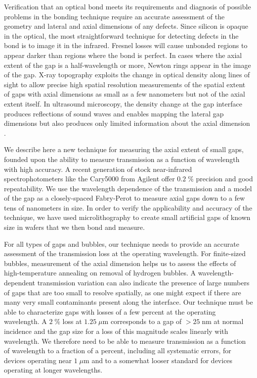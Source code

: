 Verification that an optical bond meets its requirements and diagnosis of possible problems in the bonding technique require an accurate assessment of the geometry and lateral and axial dimensions of any defects.  Since silicon is opaque in the optical, the most straightforward technique for detecting defects in the bond is to image it in the infrared.  Fresnel losses will cause unbonded regions to appear darker than regions where the bond is perfect.  In cases where the axial extent of the gap is a half-wavelength or more, Newton rings appear in the image of the gap.  X-ray topography \cite{Mitani1990} exploits the change in optical density along lines of sight to allow precise high spatial resolution measurements of the spatial extent of gaps with axial dimensions as small as a few nanometers but not of the axial extent itself. In ultrasound microscopy, the density change at the gap interface produces reflections of sound waves and enables mapping the lateral gap dimensions but also produces only limited information about the axial dimension \cite{2000RScI...71.1869G}.


We describe here a new technique for measuring the axial extent of small gaps, founded upon the ability to measure transmission as a function of wavelength with high accuracy.   A recent generation of stock near-infrared spectrophotometers like the Cary5000 from Agilent offer $0.2\;\%$ precision and good repeatability.  We use the wavelength dependence of the transmission and a model of the gap as a closely-spaced Fabry-Perot to measure axial gaps down to a few tens of nanometers in size.  In order to verify the applicability and accuracy of the technique, we have used microlithography to create small artificial gaps of known size in wafers that we then bond and measure.


For all types of gaps and bubbles, our technique needs to provide an accurate assessment of the transmission loss at the operating wavelength.  For finite-sized bubbles, measurement of the axial dimension helps us to assess the effects of high-temperature annealing \cite{Horn2009,Masteika2014} on removal of hydrogen bubbles.  A wavelength-dependent transmission variation can also indicate the presence of large numbers of gaps that are too small to resolve spatially, as one might expect if there are many very small contaminants present along the interface.  Our technique must be able to characterize gaps with losses of a few percent at the operating wavelength.  A $2\;\%$ loss at $1.25\;\mu$m corresponds to a gap of $>25\;$nm at normal incidence and the gap size for a loss of this magnitude scales linearly with wavelength.  We therefore need to be able to measure transmission as a function of wavelength to a fraction of a percent, including all systematic errors, for devices operating near $1\;\mu$m and to a somewhat looser standard for devices operating at longer wavelengths.


